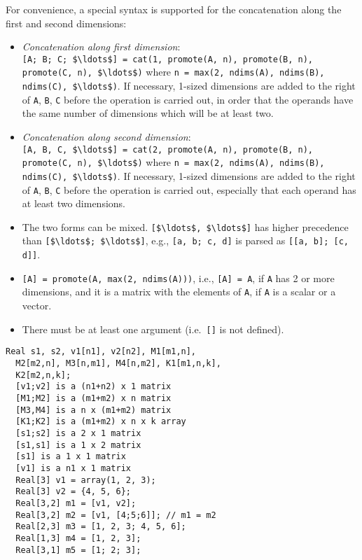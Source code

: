 For convenience, a special syntax is supported for the concatenation along the first and second dimensions:
\begin{itemize}
\item
  \emph{Concatenation along first dimension}:\\
  \lstinline[mathescape=true]![A; B; C; $\ldots$] = cat(1, promote(A, n), promote(B, n), promote(C, n), $\ldots$)!
  where \lstinline[mathescape=true]!n = max(2, ndims(A), ndims(B), ndims(C), $\ldots$)!.  If necessary, 1-sized
  dimensions are added to the right of \lstinline!A!, \lstinline!B!, \lstinline!C! before the operation is
  carried out, in order that the operands have the same number of dimensions which will be at least two.
\item
  \emph{Concatenation along second dimension}:\\
  \lstinline[mathescape=true]![A, B, C, $\ldots$] = cat(2, promote(A, n), promote(B, n), promote(C, n), $\ldots$)!
  where \lstinline[mathescape=true]!n = max(2, ndims(A), ndims(B), ndims(C), $\ldots$)!.  If necessary, 1-sized
  dimensions are added to the right of \lstinline!A!, \lstinline!B!, \lstinline!C! before the operation is
  carried out, especially that each operand has at least two dimensions.
\item
  The two forms can be mixed.  \lstinline[mathescape=true]![$\ldots$, $\ldots$]! has higher precedence than
  \lstinline[mathescape=true]![$\ldots$; $\ldots$]!, e.g., \lstinline![a, b; c, d]! is parsed as \lstinline![[a, b]; [c, d]]!.
\item
  \lstinline![A] = promote(A, max(2, ndims(A)))!, i.e., \lstinline![A] = A!, if \lstinline!A! has 2 or more dimensions, and it is a matrix
  with the elements of \lstinline!A!, if \lstinline!A! is a scalar or a vector.
\item
  There must be at least one argument (i.e.\ \lstinline![]! is not defined).
\end{itemize}

\begin{example}
\begin{lstlisting}[language=modelica]
  Real s1, s2, v1[n1], v2[n2], M1[m1,n],
  M2[m2,n], M3[n,m1], M4[n,m2], K1[m1,n,k],
  K2[m2,n,k];
  [v1;v2] is a (n1+n2) x 1 matrix
  [M1;M2] is a (m1+m2) x n matrix
  [M3,M4] is a n x (m1+m2) matrix
  [K1;K2] is a (m1+m2) x n x k array
  [s1;s2] is a 2 x 1 matrix
  [s1,s1] is a 1 x 2 matrix
  [s1] is a 1 x 1 matrix
  [v1] is a n1 x 1 matrix
  Real[3] v1 = array(1, 2, 3);
  Real[3] v2 = {4, 5, 6};
  Real[3,2] m1 = [v1, v2];
  Real[3,2] m2 = [v1, [4;5;6]]; // m1 = m2
  Real[2,3] m3 = [1, 2, 3; 4, 5, 6];
  Real[1,3] m4 = [1, 2, 3];
  Real[3,1] m5 = [1; 2; 3];
\end{lstlisting}
\end{example}

